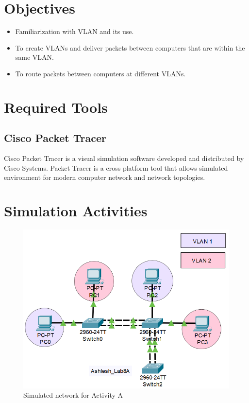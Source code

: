 \documentclass{lab_sheet}
\begin{document}
    \tableofcontents
    \pagebreak
    \listoffigures
    \pagebreak
    \listoftables
    \pagebreak
    \lstlistoflistings
    \pagebreak
    \section{Objectives}
    \begin{itemize}
        \item Familiarization with VLAN and its use.
        \item To create VLANs and deliver packets between computers that are within the same VLAN.
        \item To route packets between computers at different VLANs.
    \end{itemize}
    \section{Required Tools}
\subsection{Cisco Packet Tracer}
Cisco Packet Tracer is a visual simulation software developed and distributed by Cisco Systems. Packet Tracer is a cross platform tool that allows simulated environment for modern computer network and network topologies.
\section{Simulation Activities}
\begin{figure}[H]
	\centering
	\includegraphics[scale=.9]{Figures/activitya.png}
	\caption{Simulated network for Activity A}
	\label{fig:activitya}
\end{figure}
\end{document}
